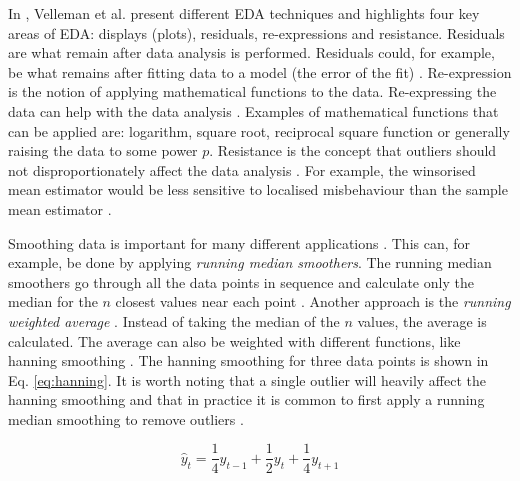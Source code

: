 In \cite{Velleman1981}, Velleman et al. present different EDA techniques and highlights four key areas of EDA: displays (plots), residuals, re-expressions and resistance.
Residuals are what remain after data analysis is performed.
Residuals could, for example, be what remains after fitting data to a model (the error of the fit) \cite{Velleman1981}.
Re-expression is the notion of applying mathematical functions to the data.
Re-expressing the data can help with the data analysis \cite{Hoaglin2003, Velleman1981}.
Examples of mathematical functions that can be applied are: logarithm, square root, reciprocal square function or generally raising the data to some power $p$.
Resistance is the concept that outliers should not disproportionately affect the data analysis \cite{Hoaglin2003, Velleman1981}.
For example, the winsorised mean estimator would be less sensitive to localised misbehaviour than the sample mean estimator \cite{Tukey1977}.

Smoothing data is important for many different applications \cite{Bradley1997, Pang2002, Quinlan1992, Velleman1981}.
This can, for example, be done by applying \emph{running median smoothers}.
The running median smoothers go through all the data points in sequence and calculate only the median for the $n$ closest values near each point \cite{Velleman1981}.
Another approach is the \emph{running weighted average} \cite{Velleman1981}.
Instead of taking the median of the $n$ values, the average is calculated.
The average can also be weighted with different functions, like hanning smoothing \cite{Velleman1981}.
The hanning smoothing for three data points is shown in Eq. \ref{eq:hanning}.
It is worth noting that a single outlier will heavily affect the hanning smoothing and that in practice it is common to first apply a running median smoothing to remove outliers \cite{Velleman1981}.

\begin{equation}
    \hat y_t = \frac{1}{4} y_{t-1} + \frac{1}{2} y_t + \frac{1}{4} y_{t + 1} 
    \label{eq:hanning}
\end{equation}